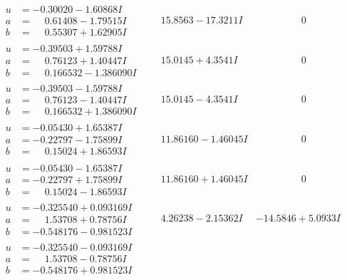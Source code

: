 \documentclass[1p]{elsarticle_modified}
\theoremstyle{definition}
\begin{document}
$$\begin{array}{c|c|c}
\begin{aligned}
u &= -0.30020 - 1.60868 I \\
a &= \phantom{-}0.61408 - 1.79515 I \\
b &= \phantom{-}0.55307 + 1.62905 I\end{aligned}
 & \phantom{-}15.8563 - 17.3211 I & \phantom{-0.000000 } 0 \\ \hline\begin{aligned}
u &= -0.39503 + 1.59788 I \\
a &= \phantom{-}0.76123 + 1.40447 I \\
b &= \phantom{-}0.166532 - 1.386090 I\end{aligned}
 & \phantom{-}15.0145 + 4.3541 I & \phantom{-0.000000 } 0 \\ \hline\begin{aligned}
u &= -0.39503 - 1.59788 I \\
a &= \phantom{-}0.76123 - 1.40447 I \\
b &= \phantom{-}0.166532 + 1.386090 I\end{aligned}
 & \phantom{-}15.0145 - 4.3541 I & \phantom{-0.000000 } 0 \\ \hline\begin{aligned}
u &= -0.05430 + 1.65387 I \\
a &= -0.22797 - 1.75899 I \\
b &= \phantom{-}0.15024 + 1.86593 I\end{aligned}
 & \phantom{-}11.86160 - 1.46045 I & \phantom{-0.000000 } 0 \\ \hline\begin{aligned}
u &= -0.05430 - 1.65387 I \\
a &= -0.22797 + 1.75899 I \\
b &= \phantom{-}0.15024 - 1.86593 I\end{aligned}
 & \phantom{-}11.86160 + 1.46045 I & \phantom{-0.000000 } 0 \\ \hline\begin{aligned}
u &= -0.325540 + 0.093169 I \\
a &= \phantom{-}1.53708 + 0.78756 I \\
b &= -0.548176 - 0.981523 I\end{aligned}
 & \phantom{-}4.26238 - 2.15362 I & -14.5846 + 5.0933 I \\ \hline\begin{aligned}
u &= -0.325540 - 0.093169 I \\
a &= \phantom{-}1.53708 - 0.78756 I \\
b &= -0.548176 + 0.981523 I\end{aligned}

\end{array}$$
\end{document}
